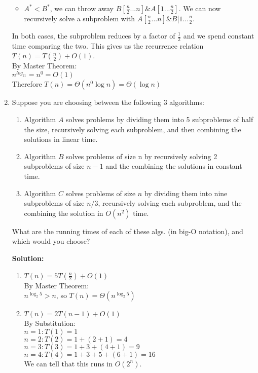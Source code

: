 \documentclass[11pt]{article}
\begin{document}
\begin{enumerate}
\begin{itemize}
\item $A^* < B^*$, we can throw away $B[\frac{n}{2}...n] \& A[1...\frac{n}{2}]$. We can now recursively solve a subproblem with $A[\frac{n}{2}...n] \& B[1...\frac{n}{2}$.
\end{itemize}

In both cases, the subproblem reduces by a factor of $\frac{1}{2}$ and we spend constant time comparing the two. This gives us the recurrence relation $T(n) = T(\frac{n}{2}) + O(1)$.\\
By Master Theorem:\\
$n^{log_21} = n^0 = O(1)$\\
Therefore $T(n) = \Theta(n^0 \log n) = \Theta(\log n)$

\item Suppose you are choosing between the following 3 algorithms:
\begin{enumerate}
\item Algorithm $A$ solves problems by dividing them into 5 subproblems of half the size, recursively solving each subproblem, and then combining the solutions in linear time.
\item Algorithm $B$ solves problems of size n by recursively solving 2 subproblems of size $n-1$ and the combining the solutions in constant time.
\item Algorithm $C$ solves problems of size $n$ by dividing them into nine subproblems of size $n/3$, recursively solving each subproblem, and the combining the solution in $O(n^2)$ time.
\end{enumerate}

What are the running times of each of these algs. (in big-O notation), and which would you choose?

\vspace*{.2cm}
\textbf{Solution:}
\begin{enumerate}

\item $T(n) = 5T(\frac{n}{2}) + O(1)$\\
\hspace{1cm} By Master Theorem:\\
\hspace{1cm} $n^{\log_2 5} > n$, so $T(n) = \Theta(n^{\log_2 5})$

\item $T(n) = 2T(n-1) + O(1)$\\
\hspace{1cm} By Substitution:\\
\hspace{1cm} $n = 1: T(1) = 1$\\
\hspace{1cm} $n = 2: T(2) = 1 + (2 + 1) = 4$\\
\hspace{1cm} $n = 3: T(3) = 1 + 3 + (4 + 1) = 9$\\
\hspace{1cm} $n = 4: T(4) = 1 + 3 + 5 + (6 + 1) = 16$\\
\hspace{1cm} We can tell that this runs in $O(2^n)$.


\end{enumerate}
\end{enumerate}
\end{document}
